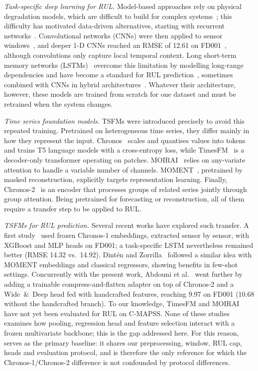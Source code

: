 \documentclass{svproc}
\begin{document}
\textit{Task-specific deep learning for RUL.} Model-based approaches rely
on physical degradation models, which are difficult to build for complex
systems~\cite{khan2018}; this difficulty has motivated data-driven
alternatives, starting with recurrent networks~\cite{heimes_recurrent_2008}.
Convolutional networks (CNNs) were then applied to sensor
windows~\cite{babu2016}, and deeper 1-D CNNs reached an RMSE of 12.61 on
FD001~\cite{li2018}, although convolutions only capture local temporal
context. Long short-term memory networks (LSTMs)~\cite{hochreiter1997}
overcome this limitation by modelling long-range dependencies and have
become a standard for RUL prediction~\cite{zheng2017}, sometimes combined
with CNNs in hybrid architectures~\cite{zhao2020}. Whatever their
architecture, however, these models are trained from scratch for one
dataset and must be retrained when the system changes.

\textit{Time series foundation models.} TSFMs were introduced precisely
to avoid this repeated training. Pretrained on heterogeneous time series,
they differ mainly in how they represent the input. Chronos~\cite{chronos2024} scales and quantises values into tokens
and trains T5 language models with a cross-entropy loss, while
TimesFM~\cite{das2024timesfm} is a decoder-only transformer operating on
patches. MOIRAI~\cite{woo2024moirai} relies on any-variate attention to
handle a variable number of channels. MOMENT~\cite{goswami2024moment}, pretrained by masked
reconstruction, explicitly targets representation learning. Finally,
Chronos-2~\cite{chronos2_2025} is an encoder that processes groups of
related series jointly through group attention. Being pretrained for forecasting or reconstruction, all of them require
a transfer step to be applied to RUL.

\textit{TSFMs for RUL prediction.} Several recent works have explored
such transfer. A first study~\cite{imsa2025} used frozen Chronos-1
embeddings, extracted sensor by sensor, with XGBoost and MLP heads on
FD001; a task-specific LSTM nevertheless remained better (RMSE 14.32 vs.\
14.92). Dint\'en and Zorrilla~\cite{dinten2025} followed a similar idea
with MOMENT embeddings and classical regressors, showing benefits in
few-shot settings. Concurrently with the present work, Abdouni et
al.~\cite{abdouni2026} went further by adding a trainable
compress-and-flatten adapter on top of Chronos-2 and a Wide~\&~Deep head
fed with handcrafted features, reaching 9.97 on FD001 (10.68 without the
handcrafted branch). To our knowledge, TimesFM and MOIRAI
have not yet been evaluated for RUL on C-MAPSS. None of these studies examines how pooling, regression
head and feature selection interact with a frozen multivariate backbone;
this is the gap addressed here. For this reason, \cite{imsa2025} serves
as the primary baseline: it shares our preprocessing, window, RUL cap,
heads and evaluation protocol, and is therefore the only reference for
which the Chronos-1/Chronos-2 difference is not confounded by protocol
differences.
\end{document}
